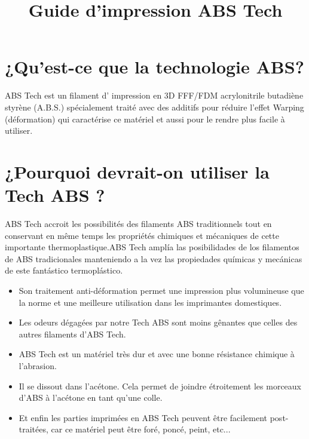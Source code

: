 \documentclass[11pt,a4paper]{article}
\title{Guide d’impression ABS Tech}
\date{}
\begin{document}

\section{¿Qu’est-ce que la technologie ABS?}ABS Tech est un filament d’ impression en 3D  FFF/FDM acrylonitrile butadiène styrène (A.B.S.) spécialement traité avec des additifs pour réduire l’effet Warping (déformation) qui  caractérise ce matériel et aussi pour le rendre plus facile à utiliser.
\section{¿Pourquoi devrait-on utiliser la Tech ABS ?}
ABS Tech accroit les possibilités des filaments ABS traditionnels tout en conservant en même temps les propriétés chimiques et mécaniques de cette importante  thermoplastique.ABS Tech amplía las posibilidades de los filamentos de ABS tradicionales manteniendo a la vez las propiedades químicas y mecánicas de este fantástico termoplástico.
\begin{itemize}
\item Son traitement anti-déformation permet une impression plus  volumineuse que la norme et une meilleure utilisation dans les imprimantes domestiques.
\item Les odeurs dégagées par notre Tech ABS sont moins gênantes que celles des autres filaments d’ABS Tech.
\item ABS Tech est un matériel très dur et avec une bonne résistance chimique à l’abrasion.
\item Il se dissout dans l’acétone. Cela permet de joindre étroitement les morceaux d’ABS à l’acétone en tant qu’une colle.
\item Et enfin les parties imprimées en ABS Tech peuvent être facilement post-traitées, car ce matériel peut être foré, poncé, peint, etc...
\end{itemize}
\end{document}
